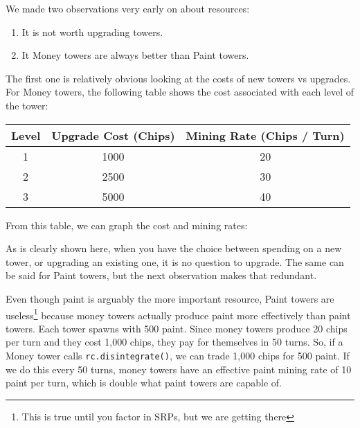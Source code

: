 \documentclass{article}
\begin{document}
  We made two observations very early on about resources:
  \begin{enumerate}
    \item It is not worth upgrading towers.
    \item It Money towers are always better than Paint towers.
  \end{enumerate}
  The first one is relatively obvious looking at the costs of new towers vs upgrades. For Money towers, the following table shows the cost associated with each level of the tower:
  \begin{center}
    \begin{tabular}{c | c | c}
      Level & Upgrade Cost (Chips) & Mining Rate (Chips / Turn) \\
      \hline 
      1 & 1000 & 20   \\
      2 & 2500 & 30   \\
      3 & 5000 & 40   \\
    \end{tabular}
  \end{center}
  From this table, we can graph the cost and mining rates:
  \begin{center}
  \end{center}
  As is clearly shown here, when you have the choice between spending on a new tower, or upgrading an existing one, it is no question to upgrade. The same can be said for Paint towers, but the next observation makes that redundant.

  \medskip

  Even though paint is arguably the more important resource, Paint towers are useless\footnote{This is true until you factor in SRPs, but we are getting there} because money towers actually produce paint more effectively than paint towers. Each tower spawns with 500 paint. Since money towers produce 20 chips per turn and they cost 1,000 chips, they pay for themselves in 50 turns. So, if a Money tower calls \verb|rc.disintegrate()|, we can trade 1,000 chips for 500 paint. If we do this every 50 turns, money towers have an effective paint mining rate of 10 paint per turn, which is double what paint towers are capable of.
\end{document}
